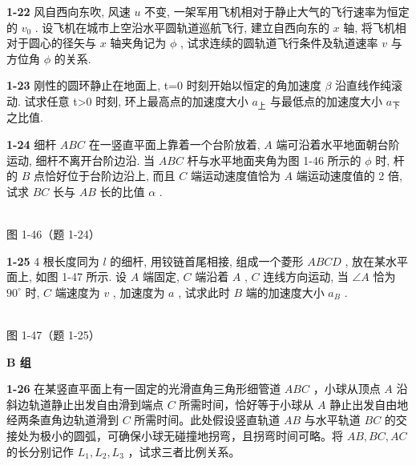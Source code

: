 \newpage

\textbf{1-22} 风自西向东吹, 风速 $u$ 不变, 一架军用飞机相对于静止大气的飞行速率为恒定的 $v_{0}$ . 设飞机在城市上空沿水平圆轨道巡航飞行, 建立自西向东的 $x$ 轴, 将飞机相对于圆心的径矢与 $x$ 轴夹角记为 $\phi$ , 试求连续的圆轨道飞行条件及轨道速率 $v$ 与方位角 $\phi$ 的关系.

\newpage

\textbf{1-23} 刚性的圆环静止在地面上, t=0 时刻开始以恒定的角加速度 $\beta$ 沿直线作纯滚动. 试求任意 t>0 时刻, 环上最高点的加速度大小 $a_{\text{上}}$ 与最低点的加速度大小 $a_{\text{下}}$ 之比值.

\newpage

\textbf{1-24} 细杆 $ABC$ 在一竖直平面上靠着一个台阶放着, $A$ 端可沿着水平地面朝台阶运动, 细杆不离开台阶边沿. 当 $ABC$ 杆与水平地面夹角为图 1-46 所示的 $\phi$ 时, 杆的 $B$ 点恰好位于台阶边沿上, 而且 $C$ 端运动速度值恰为 $A$ 端运动速度值的 2 倍, 试求 $BC$ 长与 $AB$ 长的比值 $\alpha$ .


\begin{center}
\resizebox{0.48\textwidth}{!}{}\\[4pt]
{\small 图 1-46（题 1-24）}
\end{center}

\newpage

\textbf{1-25} 4 根长度同为 $l$ 的细杆, 用铰链首尾相接, 组成一个菱形 $ABCD$ , 放在某水平面上, 如图 1-47 所示. 设 $A$ 端固定, $C$ 端沿着 $A$ , $C$ 连线方向运动, 当 $\angle A$ 恰为 $90^{\circ}$ 时, $C$ 端速度为 $v$ , 加速度为 $a$ , 试求此时 $B$ 端的加速度大小 $a_{B}$ .


\begin{center}
\resizebox{0.38\textwidth}{!}{}\\[4pt]
{\small 图 1-47（题 1-25）}
\end{center}


\newpage

\begin{center}\textbf{B 组}\end{center}

\textbf{1-26} 在某竖直平面上有一固定的光滑直角三角形细管道 $ABC$ ，小球从顶点 $A$ 沿斜边轨道静止出发自由滑到端点 $C$ 所需时间，恰好等于小球从 $A$ 静止出发自由地经两条直角边轨道滑到 $C$ 所需时间。此处假设竖直轨道 $AB$ 与水平轨道 $BC$ 的交接处为极小的圆弧，可确保小球无碰撞地拐弯，且拐弯时间可略。将 $AB, BC, AC$ 的长分别记作 $L_1, L_2, L_3$ ，试求三者比例关系。

